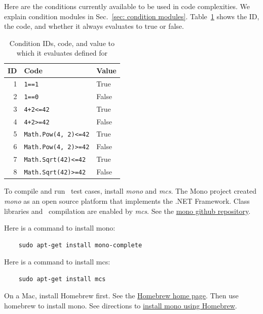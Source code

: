 \begin{appendices}
\newpage

Here are the conditions currently available to be used in code complexities.
We explain condition modules in Sec.~\ref{sec: condition modules}.
Table~\ref{tab:condition IDs for CSharp} shows the ID, the code, and whether it
always evaluates to true or false.

\begin{table}[H]
\centering
\caption{Condition IDs, code, and value to which it evaluates defined for
  \CSharp}
\begin{tabular}{|r|l|l|}
\hline
\textbf{ID} & \textbf{Code} & \textbf{Value} \\
\hline
1 & \verb|1==1| & True \\
\hline
2 & \verb|1==0| & False \\
\hline
3 & \verb|4+2<=42| & True \\
\hline
4 & \verb|4+2>=42| & False \\
\hline
5 & \verb|Math.Pow(4, 2)<=42| & True \\
\hline
6 & \verb|Math.Pow(4, 2)>=42| & False \\
\hline
7 & \verb|Math.Sqrt(42)<=42| & True \\
\hline
8 & \verb|Math.Sqrt(42)>=42| & False \\
\hline
\end{tabular}
\label{tab:condition IDs for CSharp}
\end{table}


\label{sec:run csharp}
To compile and run \CSharp\ test cases, install \emph{mono} and \emph{mcs}.
The Mono project created \emph{mono} as an open source platform that
implements the .NET Framework. Class libraries and \CSharp\ compilation are enabled
by \emph{mcs}. See the \href{http://github.com/mono/mono}{mono github repository}.

Here is a command to install mono:

\begin{verbatim}
    sudo apt-get install mono-complete
\end{verbatim}

Here is a command to install mcs:

\begin{verbatim}
    sudo apt-get install mcs
\end{verbatim}

On a Mac, install Homebrew first. See
the \href{https://brew.sh/}{Homebrew home page}.
Then use homebrew to install mono.  See directions to
\href{https://formulae.brew.sh/formula/mono}{install mono using Homebrew}.


\end{appendices}
